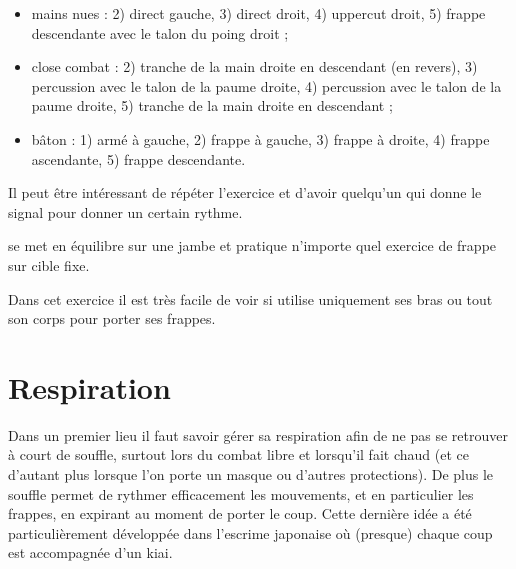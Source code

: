 \begin{exercice}
\begin{itemize}
		\item mains nues : 2) direct gauche, 3) direct droit, 4) uppercut droit, 5) frappe descendante avec le talon du poing droit ;
		
		\item close combat : 2) tranche de la main droite en descendant (en revers), 3) percussion avec le talon de la paume droite, 4) percussion avec le talon de la paume droite, 5) tranche de la main droite en descendant ;
		
		\item bâton : 1) armé à gauche, 2) frappe à gauche, 3) frappe à droite, 4) frappe ascendante, 5) frappe descendante.
		
		
	\end{itemize}

	Il peut être intéressant de répéter l'exercice et d'avoir quelqu'un qui donne le signal pour donner un certain rythme.

\end{exercice}


\begin{exercice}


	\A se met en équilibre sur une jambe et pratique n'importe quel exercice de frappe sur cible fixe.

	Dans cet exercice il est très facile de voir si \A utilise uniquement ses bras ou tout son corps pour porter ses frappes.
\end{exercice}


\section{Respiration}


Dans un premier lieu il faut savoir gérer sa respiration afin de ne pas se retrouver à court de souffle, surtout lors du combat libre et lorsqu'il fait chaud (et ce d'autant plus lorsque l'on porte un masque ou d'autres protections).
De plus le souffle permet de rythmer efficacement les mouvements, et en particulier les frappes, en expirant au moment de porter le coup.
Cette dernière idée a été particulièrement développée dans l'escrime japonaise où (presque) chaque coup est accompagnée d'un kiai.


